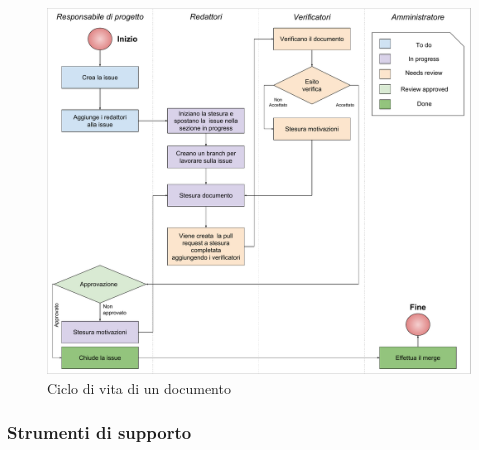 \begin{figure}[H]
\centering
\includegraphics[width=17cm,trim=2 2 2 2, clip]{img/cicloVitaDocumento.pdf}
\caption{Ciclo di vita di un documento}
\label{fig:document_lifecycle}
\end{figure}


\subsubsection{Strumenti di supporto} 

